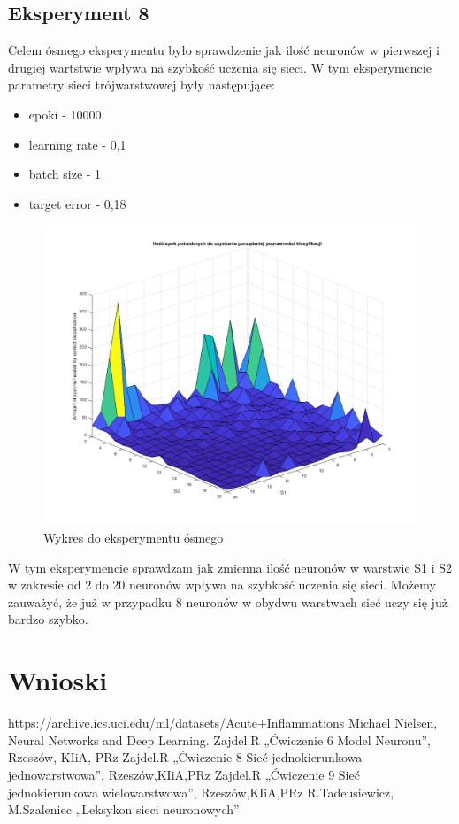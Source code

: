 \documentclass[12pt,twoside]{article}
\begin{document}
\subsection{Eksperyment 8}
Celem ósmego eksperymentu było sprawdzenie jak ilość neuronów w pierwszej i drugiej wartstwie wpływa na szybkość uczenia się sieci.
W tym eksperymencie parametry sieci trójwarstwowej były następujące:
\begin{itemize}
	\item epoki - 10000
	\item learning rate - 0,1
	\item batch size - 1
	\item target error - 0,18
\end{itemize}
\begin{figure}[ht!]
	\centering
	\includegraphics[width=15cm]{figures/S1=2+_S2=2+_epo.png}
	\caption{Wykres do eksperymentu ósmego}
\end{figure}
W tym eksperymencie sprawdzam jak zmienna ilość neuronów w warstwie S1 i S2 w zakresie od 2 do 20 neuronów wpływa na szybkość uczenia się sieci. Możemy zauważyć, że już w przypadku 8 neuronów w obydwu warstwach sieć uczy się już bardzo szybko.
\newpage


\clearpage

\section{Wnioski}

\clearpage


\begin{thebibliography}{4}
 https://archive.ics.uci.edu/ml/datasets/Acute+Inflammations
 Michael Nielsen, Neural Networks and Deep Learning.
 Zajdel.R „Ćwiczenie 6 Model Neuronu”, Rzeszów, KIiA, PRz
 Zajdel.R „Ćwiczenie 8 Sieć jednokierunkowa jednowarstwowa”, Rzeszów,KIiA,PRz
 Zajdel.R „Ćwiczenie 9 Sieć jednokierunkowa wielowarstwowa”, Rzeszów,KIiA,PRz
 R.Tadeusiewicz, M.Szaleniec „Leksykon sieci neuronowych”
\end{thebibliography}

\clearpage
\end{document}
